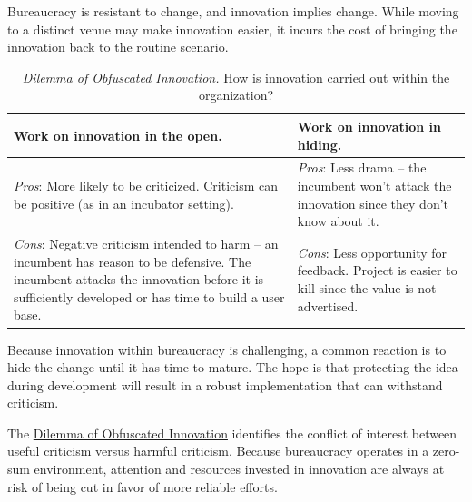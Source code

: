 Bureaucracy is resistant to change, and innovation implies change. While moving to a distinct venue may make innovation easier, it incurs the cost of bringing the innovation back to the routine scenario.

\begin{center}
\begin{table}[H] %
\begin{tabular}{ | m{\dilemmatablewidth}| m{\dilemmatablewidth} | } 
  \hline
  \textbf{Work on innovation in the open.} &
  \textbf{Work on innovation in hiding.} \\
  \hline
  \textit{Pros}: More likely to be criticized. Criticism can be positive (as in an incubator setting).& 
  \textit{Pros}: Less drama -- the incumbent won't attack the innovation since they don't know about it. \\
  \hline
  \textit{Cons}: Negative criticism intended to harm -- an incumbent has reason to be defensive. The incumbent attacks the innovation before it is sufficiently developed or has time to build a user base. & 
  \textit{Cons}: Less opportunity for feedback. Project is easier to kill since the value is not advertised.\\
  \hline
\end{tabular}
\caption{
\textit{Dilemma of Obfuscated Innovation.}
How is innovation carried out within the organization?
}
\label{table:dilemma-personal-innovate-open-obscure}
\end{table}
\end{center}

Because innovation within bureaucracy is challenging, a common reaction is to hide the change until it has time to mature. The hope is that protecting the idea during development will result in a robust implementation that can withstand criticism. 

The \hyperref[table:dilemma-personal-innovate-open-obscure]{Dilemma of Obfuscated Innovation} 
\iftoggle{printedonpaper}{ (\ref{table:dilemma-personal-innovate-open-obscure}) }{}%
identifies the conflict of interest between useful criticism versus harmful criticism. Because bureaucracy operates in a zero-sum environment, attention and resources invested in innovation are always at risk of being cut in favor of more reliable efforts. 

